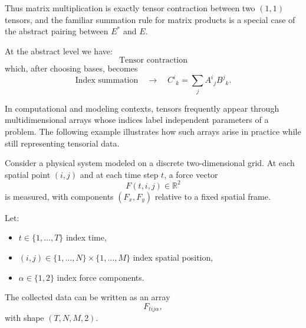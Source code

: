 Thus matrix multiplication is exactly tensor contraction between two $(1,1)$
tensors, and the familiar summation rule for matrix products is a special case
of the abstract pairing between $E^*$ and $E$.

\medskip

At the abstract level we have:
\[
\text{Tensor contraction}
\]
which, after choosing bases, becomes
\[
\text{Index summation}
\quad\longrightarrow\quad
C^{i}{}_{k} = \sum_j A^{i}{}_{j} B^{j}{}_{k}.
\]



\medskip

In computational and modeling contexts, tensors frequently appear through
multidimensional arrays whose indices label independent parameters of a problem.
The following example illustrates how such arrays arise in practice while still
representing tensorial data.

\medskip

Consider a physical system modeled on a discrete two-dimensional grid.
At each spatial point $(i,j)$ and at each time step $t$, a force vector
\[
F(t,i,j) \in \mathbb{R}^2
\]
is measured, with components $(F_x, F_y)$ relative to a fixed spatial frame.

\medskip

Let:
\begin{itemize}
\item $t \in \{1,\dots,T\}$ index time,
\item $(i,j) \in \{1,\dots,N\} \times \{1,\dots,M\}$ index spatial position,
\item $\alpha \in \{1,2\}$ index force components.
\end{itemize}

The collected data can be written as an array
\[
F_{t i j \alpha},
\]
with shape $(T,N,M,2)$.

